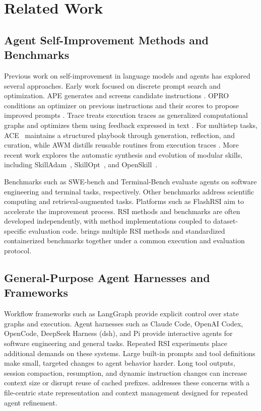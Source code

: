 \section{Related Work}

\subsection{Agent Self-Improvement Methods and Benchmarks}

Previous work on self-improvement in language models and agents has explored several approaches. Early work focused on discrete prompt search and optimization. APE generates and screens candidate instructions \citep{zhou2023ape}. OPRO conditions an optimizer on previous instructions and their scores to propose improved prompts \citep{yang2024opro}. Trace treats execution traces as generalized computational graphs and optimizes them using feedback expressed in text \citep{cheng2024trace}. For multistep tasks, ACE~\citep{zhang2026agentic} maintains a structured playbook through generation, reflection, and curation, while AWM distills reusable routines from execution traces \citep{wang2024awm}. More recent work explores the automatic synthesis and evolution of modular skills, including SkillAdam~\citep{li2026skilladam}, SkillOpt~\citep{yang2026skillopt}, and OpenSkill~\citep{yan2026openskill}.

Benchmarks such as SWE-bench and Terminal-Bench evaluate agents on software engineering and terminal tasks, respectively. Other benchmarks address scientific computing and retrieval-augmented tasks. Platforms such as FlashRSI aim to accelerate the improvement process. RSI methods and benchmarks are often developed independently, with method implementations coupled to dataset-specific evaluation code. \fwname brings multiple RSI methods and standardized containerized benchmarks together under a common execution and evaluation protocol.

\subsection{General-Purpose Agent Harnesses and Frameworks}

Workflow frameworks such as LangGraph provide explicit control over state graphs and execution. Agent harnesses such as Claude Code, OpenAI Codex, OpenCode, DeepSeek Harness (dsh), and Pi provide interactive agents for software engineering and general tasks. Repeated RSI experiments place additional demands on these systems. Large built-in prompts and tool definitions make small, targeted changes to agent behavior harder. Long tool outputs, session compaction, resumption, and dynamic instruction changes can increase context size or disrupt reuse of cached prefixes. \fwname addresses these concerns with a file-centric state representation and context management designed for repeated agent refinement.
